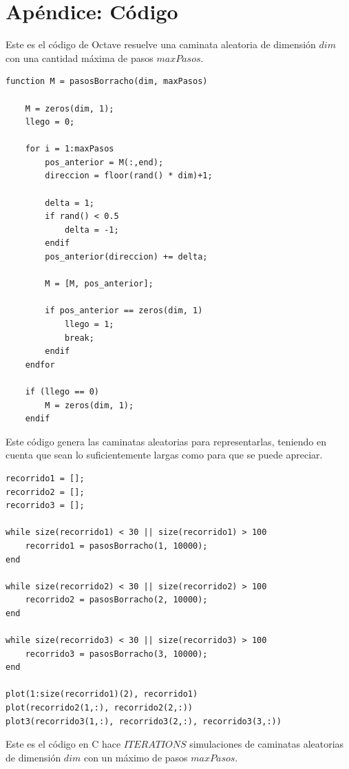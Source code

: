\documentclass[a4paper,10pt]{article}
\begin{document}
\section{Apéndice: Código}
Este es el c\'odigo de Octave resuelve una caminata aleatoria de dimensi\'on $dim$ con una cantidad m\'axima de pasos $maxPasos$.
\label{Code1}
\begin{lstlisting}
function M = pasosBorracho(dim, maxPasos)

	M = zeros(dim, 1);
	llego = 0;

	for i = 1:maxPasos
		pos_anterior = M(:,end);
		direccion = floor(rand() * dim)+1;

		delta = 1;
		if rand() < 0.5
			delta = -1;
		endif
		pos_anterior(direccion) += delta;

		M = [M, pos_anterior];

		if pos_anterior == zeros(dim, 1)
			llego = 1;
			break;
		endif
	endfor

	if (llego == 0)
		M = zeros(dim, 1);
	endif
\end{lstlisting}
\label{Code2}
Este c\'odigo genera las caminatas aleatorias para representarlas, teniendo en cuenta que sean lo suficientemente largas como para
que se puede apreciar. 
\begin{lstlisting}
recorrido1 = [];
recorrido2 = [];
recorrido3 = [];

while size(recorrido1) < 30 || size(recorrido1) > 100
	recorrido1 = pasosBorracho(1, 10000);
end

while size(recorrido2) < 30 || size(recorrido2) > 100
	recorrido2 = pasosBorracho(2, 10000);
end

while size(recorrido3) < 30 || size(recorrido3) > 100
	recorrido3 = pasosBorracho(3, 10000);
end

plot(1:size(recorrido1)(2), recorrido1)
plot(recorrido2(1,:), recorrido2(2,:))
plot3(recorrido3(1,:), recorrido3(2,:), recorrido3(3,:))
\end{lstlisting}
\newpage
\label{CodeC}
Este es el c\'odigo en C hace $ITERATIONS$ simulaciones de caminatas aleatorias de dimensi\'on $dim$ con un m\'aximo de pasos
$maxPasos$.
\end{document}
